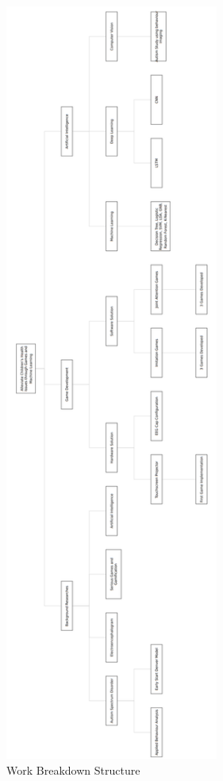 \begin{appendices}


\clearpage
\begin{figure}[ht!]%
    \centering
    \includegraphics[width=7cm]{images/WBS1}%
    \caption{Work Breakdown Structure}%
\end{figure}


\end{appendices}
